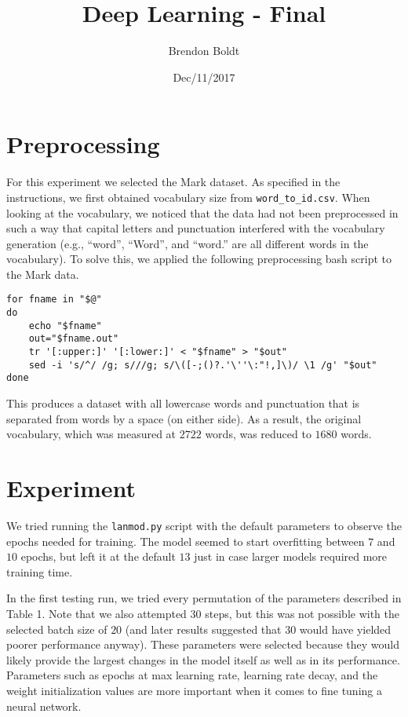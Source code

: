 \documentclass[a4paper]{article}
\title{Deep Learning - Final}
\author{Brendon Boldt}
\date{Dec/11/2017}
\begin{document}

\maketitle

%
\iffalse
\begin{lstlisting}
\end{lstlisting}
\fi

\section{Preprocessing}

For this experiment we selected the Mark dataset. As specified in the
instructions, we first obtained vocabulary size from \texttt{word\_to\_id.csv}.
When looking at the vocabulary, we noticed that the data had not been
preprocessed in such a way that capital letters and punctuation interfered with
the vocabulary generation (e.g., ``word'', ``Word'', and ``word.'' are all
different words in the vocabulary). To solve this, we applied the following
preprocessing bash script to the Mark data.

\begin{lstlisting}
for fname in "$@"
do
    echo "$fname"
    out="$fname.out"
    tr '[:upper:]' '[:lower:]' < "$fname" > "$out"
    sed -i 's/^/ /g; s///g; s/\([-;()?.'\''\:"!,]\)/ \1 /g' "$out"
done
\end{lstlisting}
This produces a dataset with all lowercase words and punctuation that is
separated from words by a space (on either side).
As a result, the original vocabulary, which was measured at $2722$ words, was
reduced to $1680$ words.

\section{Experiment}

We tried running the \texttt{lanmod.py} script with the default parameters to
observe the epochs needed for training. The model seemed to start overfitting
between $7$ and $10$ epochs, but left it at the default $13$ just in case larger
models required more training time.

In the first testing run, we tried every permutation of the parameters described
in Table 1. Note that we also attempted $30$ steps, but this was not possible
with the selected batch size of $20$ (and later results suggested that $30$
would have yielded poorer performance anyway). These parameters were selected
because they would likely provide the largest changes in the model itself
as well as in its performance. Parameters such as epochs at max learning rate,
learning rate decay, and the weight initialization values are more important
when it comes to fine tuning a neural network.
\end{document}
